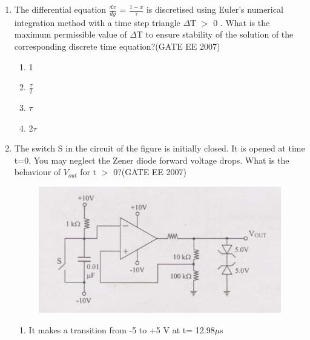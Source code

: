 \documentclass[a4paper,10pt]{exam}
\theoremstyle{remark}
\begin{document}
\begin{enumerate}
\begin{figure}[!ht]
\end{figure}
\begin{multicols}{4}
\begin{enumerate}
 \item S is always either zero or odd
\item S is always either zero or even
\item  s = 1 only if the sum of A, B, C and D is even 
\item s = 1 only if the sum of A, B, C and D is odd
\end{enumerate}
\end{multicols}
\vspace{0.5cm}
\item  The differential equation $\frac{dx}{dy}$ = $\frac{1-x}{\tau}$ is discretised using Euler's numerical integration method with a time step triangle $\Delta$T $>$  0 . What is the maximum permissible value of $\Delta$T to ensure stability of the solution of the corresponding discrete time equation?\hfill{(GATE EE 2007)} 
\begin{multicols}{4}
\begin{enumerate}
 \item 1
\item $\frac{\tau}{2}$
\item $\tau$
\item 2$\tau$
\end{enumerate}
\end{multicols}

\item  The switch S in the circuit of the figure is initially closed. It is opened at time t=0. You may neglect the Zener diode forward voltage drops. What is the behaviour of $V_{out}$ for t $>$ 0?\hfill{(GATE EE 2007)} 

\begin{figure}[H]
    \centering
    \includegraphics[width=0.5\linewidth]{figs/Q24 2007.png} 
   \caption{}
    \label{fig:myfigure}
\end{figure}

\begin{enumerate}
 \item  It makes a transition from -5 to +5 V at t= 12.98$\mu$s


\end{enumerate}
\end{enumerate}
\end{document}
